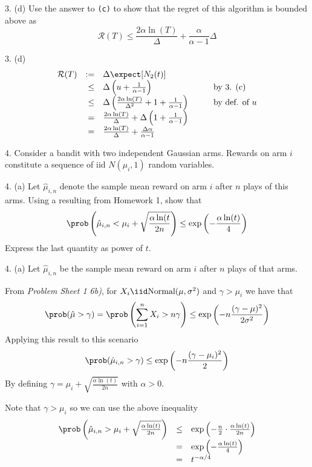 \documentclass[11pt,a4paper]{article}
\begin{document}
\begin{question}{3. (d)}
  Use the answer to \texttt{(c)} to show that the regret of this algorithm is bounded above as
  \[ \mathcal{R}(T)\leq\frac{2\alpha\ln(T)}\Delta+\frac{\alpha}{\alpha-1}\Delta \]
\end{question}

\begin{answer}{3. (d)}
  \[\begin{array}{rrlcl}
  \mathcal{R}(T)&:=&\Delta\expect[N_2(t)]&\quad&\\
  &\leq&\Delta\left(u+\frac1{\alpha-1}\right)&&\text{by 3. (c)}\\
  &\leq&\Delta\left(\frac{2\alpha\ln(T)}{\Delta^2}+1+\frac1{\alpha-1}\right)&&\text{by def. of }u\\
  &=&\frac{2\alpha\ln(T)}{\Delta}+\Delta\left(1+\frac1{\alpha-1}\right)\\
  &=&\frac{2\alpha\ln(T)}{\Delta}+\frac{\Delta\alpha}{\alpha-1}
  \end{array}\]
\end{answer}

\begin{question}{4.}
  Consider a bandit with two independent Gaussian arms. Rewards on arm $i$ constitute a sequence of iid $N(\mu_i,1)$ random variables.
\end{question}

\begin{question}{4. (a)}
  Let $\hat\mu_{i,n}$ denote the sample mean reward on arm $i$ after $n$ plays of this arms. Using a resulting from Homework 1, show that
  \[ \prob\left(\hat\mu_{i,n}<\mu_i+\sqrt{\frac{\alpha\ln(t}{2n}}\right)\leq\exp\left(-\frac{\alpha\ln(t)}4\right) \]
  Express the last quantity as power of $t$.
\end{question}

\begin{answer}{4. (a)}
  Let $\hat\mu_{i,n}$ be the sample mean reward on arm $i$ after $n$ plays of that arms.
  \par From \textit{Problem Sheet 1 6b)}, for $X_i\iid\text{Normal}(\mu,\sigma^2)$ and $\gamma>\mu_i$ we have that
  \[ \prob(\hat\mu>\gamma)=\prob\left(\sum_{i=1}^n X_i>n\gamma\right)\leq\exp\left(-n\frac{(\gamma-\mu)^2}{2\sigma^2}\right) \]
  Applying this result to this scenario
  \[ \prob(\hat\mu_{i,n}>\gamma)\leq\exp\left(-n\frac{(\gamma-\mu_i)^2}2\right) \]
  By defining $\gamma=\mu_i+\sqrt{\frac{\alpha\ln(t)}{2n}}$ with $\alpha>0$.
  \par Note that $\gamma>\mu_i$ so we can use the above inequality
  \[\begin{array}{rcl}
  \prob\left(\hat\mu_{i,n}>\mu_i+\sqrt{\frac{\alpha\ln(t)}{2n}}\right)&\leq&\exp\left(-\frac{n}2\cdot\frac{\alpha\ln(t)}{2n}\right)\\
  &=&\exp\left(-\frac{\alpha\ln(t)}4\right)\\
  &=&t^{-\alpha/4}
  \end{array}\]
\end{answer}
\end{document}
